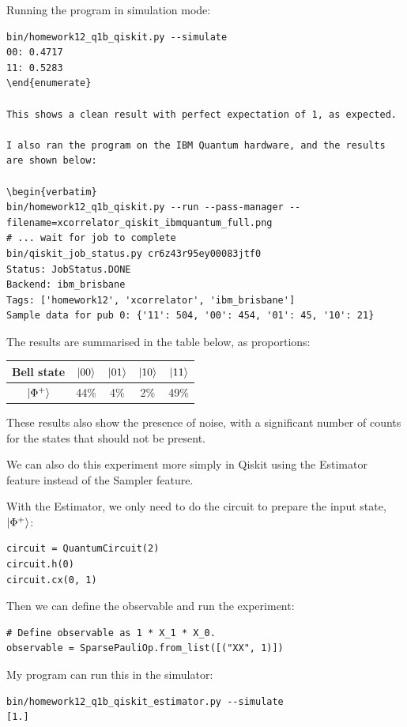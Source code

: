 \documentclass[12pt]{extarticle}
\begin{document}
\begin{enumerate}[(a)]
Running the program in simulation mode:

\begin{verbatim}
bin/homework12_q1b_qiskit.py --simulate
00: 0.4717
11: 0.5283
\end{enumerate}

This shows a clean result with perfect expectation of 1, as expected.

I also ran the program on the IBM Quantum hardware, and the results are shown below:

\begin{verbatim}
bin/homework12_q1b_qiskit.py --run --pass-manager --filename=xcorrelator_qiskit_ibmquantum_full.png
# ... wait for job to complete
bin/qiskit_job_status.py cr6z43r95ey00083jtf0
Status: JobStatus.DONE
Backend: ibm_brisbane
Tags: ['homework12', 'xcorrelator', 'ibm_brisbane']
Sample data for pub 0: {'11': 504, '00': 454, '01': 45, '10': 21}
\end{verbatim}

The results are summarised in the table below, as proportions:

\begin{center}
\begin{tabular}{|c|c|c|c|c|}
\hline
Bell state & $\ket{00}$ & $\ket{01}$ & $\ket{10}$ & $\ket{11}$ \\
\hline
$\ket{\Phi^{+}}$ & 44\% &  4\% &  2\% & 49\% \\
\hline
\end{tabular}
\end{center}

These results also show the presence of noise, with a significant number of counts for the states that should not be present.

We can also do this experiment more simply in Qiskit using the Estimator feature instead of the Sampler feature.

With the Estimator, we only need to do the circuit to prepare the input state, $\ket{\Phi^{+}}$:
\begin{verbatim}
circuit = QuantumCircuit(2)
circuit.h(0)
circuit.cx(0, 1)
\end{verbatim}
Then we can define the observable and run the experiment:
\begin{verbatim}
# Define observable as 1 * X_1 * X_0.
observable = SparsePauliOp.from_list([("XX", 1)])
\end{verbatim}

My program can run this in the simulator:
\begin{verbatim}
bin/homework12_q1b_qiskit_estimator.py --simulate
[1.]
\end{verbatim}


\end{enumerate}
\end{document}
